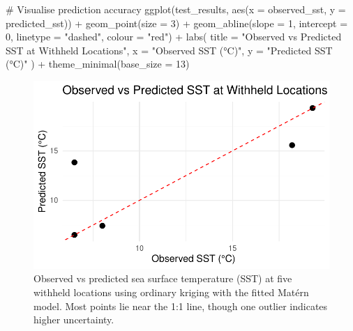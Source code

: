 \documentclass[
  11pt,
]{article}
\newenvironment{Shaded}{\begin{snugshade}}{\end{snugshade}}
\newcommand{\AttributeTok}[1]{\textcolor[rgb]{0.40,0.45,0.13}{#1}}
\newcommand{\CommentTok}[1]{\textcolor[rgb]{0.37,0.37,0.37}{#1}}
\newcommand{\DecValTok}[1]{\textcolor[rgb]{0.68,0.00,0.00}{#1}}
\newcommand{\FunctionTok}[1]{\textcolor[rgb]{0.28,0.35,0.67}{#1}}
\newcommand{\NormalTok}[1]{\textcolor[rgb]{0.00,0.23,0.31}{#1}}
\newcommand{\SpecialCharTok}[1]{\textcolor[rgb]{0.37,0.37,0.37}{#1}}
\newcommand{\StringTok}[1]{\textcolor[rgb]{0.13,0.47,0.30}{#1}}
\begin{document}
\begin{Shaded}
\begin{Highlighting}[]
\CommentTok{\# Visualise prediction accuracy}
\FunctionTok{ggplot}\NormalTok{(test\_results, }\FunctionTok{aes}\NormalTok{(}\AttributeTok{x =}\NormalTok{ observed\_sst, }\AttributeTok{y =}\NormalTok{ predicted\_sst)) }\SpecialCharTok{+}
  \FunctionTok{geom\_point}\NormalTok{(}\AttributeTok{size =} \DecValTok{3}\NormalTok{) }\SpecialCharTok{+}
  \FunctionTok{geom\_abline}\NormalTok{(}\AttributeTok{slope =} \DecValTok{1}\NormalTok{, }\AttributeTok{intercept =} \DecValTok{0}\NormalTok{, }\AttributeTok{linetype =} \StringTok{"dashed"}\NormalTok{, }\AttributeTok{colour =} \StringTok{"red"}\NormalTok{) }\SpecialCharTok{+}
  \FunctionTok{labs}\NormalTok{(}
    \AttributeTok{title =} \StringTok{"Observed vs Predicted SST at Withheld Locations"}\NormalTok{,}
    \AttributeTok{x =} \StringTok{"Observed SST (°C)"}\NormalTok{,}
    \AttributeTok{y =} \StringTok{"Predicted SST (°C)"}
\NormalTok{  ) }\SpecialCharTok{+}
  \FunctionTok{theme\_minimal}\NormalTok{(}\AttributeTok{base\_size =} \DecValTok{13}\NormalTok{)}
\end{Highlighting}
\end{Shaded}

\begin{figure}[H]

{\centering \includegraphics{project_files/figure-pdf/fig-krigscatter-1.pdf}

}

\caption{Observed vs predicted sea surface temperature (SST) at five
withheld locations using ordinary kriging with the fitted Matérn model.
Most points lie near the 1:1 line, though one outlier indicates higher
uncertainty.}

\end{figure}%
\end{document}
